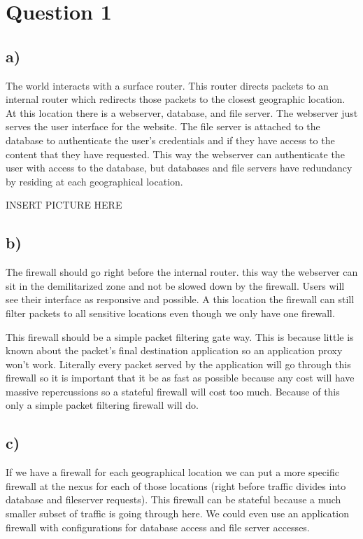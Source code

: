 \documentclass{article}
\begin{document}
\section{Question 1} %
\label{sec:question_1}
\subsection{a)} %
\label{sub:a_}
The world interacts with a surface router. This router directs packets  to an internal router which redirects those packets to the closest geographic location. At this location there is a webserver, database, and file server. The webserver just serves the user interface for the website. The file server is attached to the database to authenticate the user's credentials and if they have access to the content that they have requested. This way the webserver can authenticate the user with access to the database, but databases and file servers have redundancy by residing at each geographical location.

INSERT PICTURE HERE	

\subsection{b)} %
\label{sub:b_}
The firewall should go right before the internal router. this way the webserver can sit in the demilitarized zone and not be slowed down by the firewall. Users will see their interface as responsive and possible. A this location the firewall can still filter packets to all sensitive locations even though we only have one firewall.

This firewall should be a simple packet filtering gate way. This is because little is known about the packet's final destination application so an application proxy won't work. Literally every packet served by the application will go through this firewall so it is important that it be as fast as possible because any cost will have massive repercussions so a stateful firewall will cost too much. Because of this only a simple packet filtering firewall will do.

\subsection{c)} %
\label{sub:c_}
If we have a firewall for each geographical location we can put a more specific firewall at the nexus for each of those locations (right before traffic divides into database and fileserver requests). This firewall can be stateful because a much smaller subset of traffic is going through here. We could even use an application firewall with configurations for database access and file server accesses.
\end{document}
